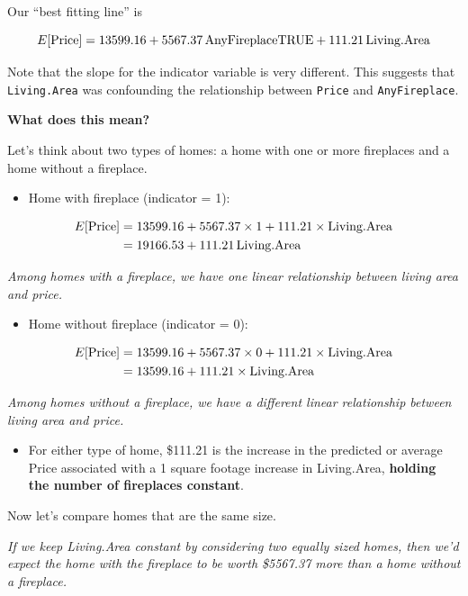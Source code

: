 \documentclass[]{book}
\providecommand{\tightlist}{%
  \setlength{\itemsep}{0pt}\setlength{\parskip}{0pt}}
\begin{document}
Our ``best fitting line'' is

\[ E[\hbox{Price}] = 13599.16 + 5567.37\,\hbox{AnyFireplaceTRUE} + 111.21\,\hbox{Living.Area} \]

Note that the slope for the indicator variable is very different. This suggests that \texttt{Living.Area} was confounding the relationship between \texttt{Price} and \texttt{AnyFireplace}.

\textbf{What does this mean?}

Let's think about two types of homes: a home with one or more fireplaces and a home without a fireplace.

\begin{itemize}
\tightlist
\item
  Home with fireplace (indicator = 1):
\end{itemize}

\begin{align*}
E[\hbox{Price}] &= 13599.16 + 5567.37 \times 1 + 111.21 \times \hbox{Living.Area} \\
&= 19166.53 + 111.21\,\hbox{Living.Area}
\end{align*}

\emph{Among homes with a fireplace, we have one linear relationship between living area and price.}

\begin{itemize}
\tightlist
\item
  Home without fireplace (indicator = 0):
\end{itemize}

\begin{align*}
E[\hbox{Price}] &= 13599.16 + 5567.37 \times 0 + 111.21 \times \hbox{Living.Area} \\
&= 13599.16 + 111.21 \times \hbox{Living.Area}
\end{align*}

\emph{Among homes without a fireplace, we have a different linear relationship between living area and price.}

\begin{itemize}
\tightlist
\item
  For either type of home, \$111.21 is the increase in the predicted or average Price associated with a 1 square footage increase in Living.Area, \textbf{holding the number of fireplaces constant}.
\end{itemize}

Now let's compare homes that are the same size.

\emph{If we keep Living.Area constant by considering two equally sized homes, then we'd expect the home with the fireplace to be worth \$5567.37 more than a home without a fireplace.}
\end{document}
